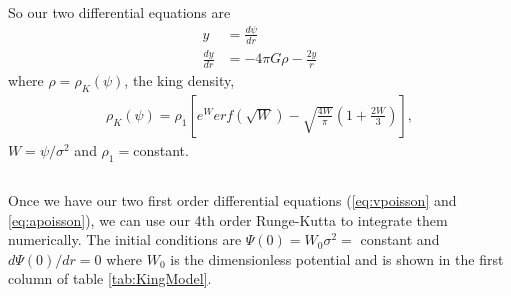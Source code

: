 So our two differential equations are
\begin{align}
    y&=\frac{d\psi}{dr}
    \label{eq:vpoisson}\\
    \frac{dy}{dr}&=-4\pi G\rho-\frac{2y}{r}
    \label{eq:apoisson}
\end{align}
where $\rho=\rho_K(\psi)$, the king density,
\begin{equation}
    \begin{split}
        \rho_K(\psi)=\rho_1\left[ e^{W}erf(\sqrt{W})-\sqrt{\frac{4W}{\pi}}\left(1+\frac{2W}{3}\right)\right],
    \end{split}
\end{equation}
$W=\psi/\sigma^2$ and $\rho_1=$constant.


\subsection{}


Once we have our two first order differential equations (\ref{eq:vpoisson} and \ref{eq:apoisson}), we can use our 4th order Runge-Kutta to integrate them numerically. The initial conditions are $\Psi(0) = W_0\sigma^2 = $ constant and $d\Psi(0)/dr = 0$ where $W_0$ is the dimensionless potential and is shown in the first column of table \ref{tab:KingModel}. 

